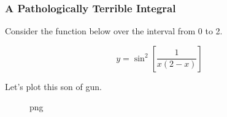 \subsubsection{A Pathologically Terrible
Integral}\label{a-pathologically-terrible-integral}

Consider the function below over the interval from 0 to 2.

\[y = \sin^2\left[\dfrac{1}{x(2-x)}\right]\]

Let's plot this son of gun.

\begin{Shaded}
\begin{Highlighting}[]
\OperatorTok{=}\NormalTok{,}\NormalTok{,}\NormalTok{)}
\OperatorTok{=}\OperatorTok{/}\OperatorTok{*}\NormalTok{(}\OperatorTok{{-}}\OperatorTok{**}

\OperatorTok{=}\NormalTok{(}\NormalTok{,}\NormalTok{))}
\NormalTok{plt.axis([}\NormalTok{, }\NormalTok{, }\NormalTok{, }\NormalTok{])}
\end{Highlighting}
\end{Shaded}

\begin{figure}
\centering
{}
\caption{png}
\end{figure}

